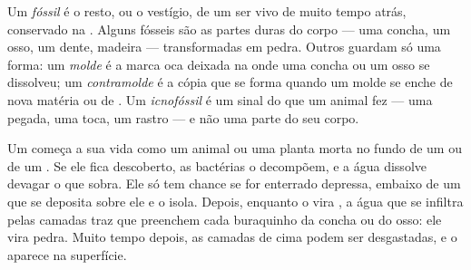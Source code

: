 \begin{definition}[Fóssil]\label{def:g7:sediments-and-fossils:fossil}
Um \emph{fóssil} é o resto, ou o vestígio, de um ser
vivo de muito tempo atrás, conservado na . Alguns fósseis são as
partes duras do corpo --- uma concha, um osso, um dente, madeira ---
transformadas em pedra. Outros guardam só uma forma: um
\emph{molde} é a marca oca deixada na  onde uma concha
ou um osso se dissolveu; um \emph{contramolde} é a
cópia que se forma quando um molde se enche de nova matéria  ou de
. Um \emph{icnofóssil} é um sinal
do que um animal fez --- uma pegada, uma toca, um rastro --- e não uma
parte do seu corpo.
\end{definition}

Um  começa a sua vida como um animal ou uma planta morta no fundo
de um  ou de um . Se ele fica descoberto, as bactérias o
decompõem, e a água dissolve devagar o que sobra. Ele só tem chance se
for enterrado depressa, embaixo de um  que se deposita sobre ele
e o isola. Depois, enquanto o  vira , a água que se
infiltra pelas camadas traz  que preenchem cada buraquinho da
concha ou do osso: ele vira pedra. Muito tempo depois, as camadas de cima
podem ser desgastadas, e o  aparece na superfície.

